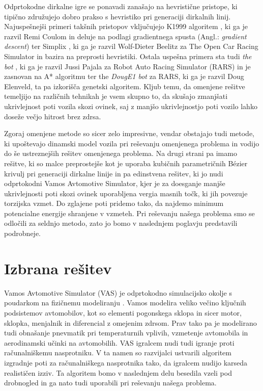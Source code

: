 \documentclass[10pt,a4paper]{article}
\begin{document}
Odprtokodne dirkalne igre se ponavadi zanašajo na hevristične pristope, ki tipično združujejo dobro prakso s hevristiko pri generaciji dirkalnih linij. Najuspešnejši primeri takšnih pristopov vključujejo K1999 algoritem \cite{vir5}, ki ga je razvil Remi Coulom in deluje na podlagi gradientnega spusta (Angl.: \textit{gradient descent}) ter Simplix \cite{vir6}, ki ga je razvil Wolf-Dieter Beelitz za The Open Car Racing Simulator in bazira na preprosti hevristiki. Ostala uspešna primera sta tudi \textit{the bot} \cite{vir7}, ki ga je razvil Jussi Pajala za Robot Auto Racing Simulator (RARS) in je zasnovan na A* algoritmu ter the \textit{DougE1 bot} za RARS, ki ga je razvil Doug Elenveld, ta pa izkorišča genetski algoritem. Kljub temu, da omenjene rešitve temeljijo na različnih tehnikah je vsem skupno to, da skušajo zmanjšati ukrivlejnost poti vozila skozi ovinek, saj z manjšo ukrivlejnostjo poti vozilo lahko doseže večjo hitrost brez zdrsa.

Zgoraj omenjene metode so sicer zelo impresivne, vendar obstajajo tudi metode, ki upoštevajo dinamski model vozila pri reševanju omenjenega problema in vodijo do še ustreznejših rešitev omenjenega problema. Na drugi strani pa imamo rešitve, ki so malce preprostejše kot je uporaba kubičnih parametričnih Bézier krivulj pri generaciji dirkalne linije \cite{vir8} in pa edinstvena rešitev, ki jo nudi odprtokodni Vamos Avtomotive Simulator, kjer je za doesganje manjše ukrivlejnosti poti skozi ovinek uporabljena vergia masnih točk, ki jih povezuje torzijska vzmet. Do zglajene poti pridemo tako, da najdemo minimum potencialne energije shranjene v vzmeteh. Pri reševanju našega problema smo se odločili za seldnjo metodo, zato jo bomo v naslednjem poglavju predstavili podrobneje.

\section{Izbrana rešitev}

Vamos Avtomotive Simulator (VAS) je odprtokodno simulacijsko okolje s poudarkom na fizičnemu modeliranju \cite{vir9}. Vamos modelira veliko večino ključnih podsistemov avtomobilov, kot so elementi pogonskega sklopa in sicer motor, sklopka, menjalnik in diferencial z omejenim zdrsom. Prav tako pa je modelirano tudi obnašanje pnevmatik pri temperaturnih vplivih, vzmetenje avtomobila in aerodinamski učinki na avtomobilih. VAS igralcem nudi tudi igranje proti računalniškemu nasprotniku. V ta namen so razvijalci ustvarili algoritem izgradnje poti za računalniškega nasprotnika tako, da igralcem nudijo karseda realističen izziv. Ta algoritem bomo v naslednjem delu besedila vzeli pod drobnogled in ga nato tudi uporabili pri reševanju našega problema.
\end{document}

